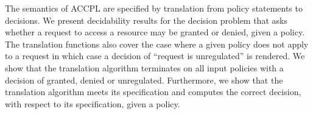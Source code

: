 The semantics of \ac{ACCPL} are specified by translation from policy statements to decisions. We present decidability results for the decision problem that asks whether a request to access a resource may be granted or denied, given a policy. The translation functions also cover the case where a given policy does not apply to a request in which case a decision of ``request is unregulated'' is rendered. We show that the translation algorithm terminates on all input policies with a decision of granted, denied or unregulated. Furthermore, we show that the translation algorithm meets its specification and computes the correct decision, with respect to its specification, given a policy. 

\cleardoublepage

